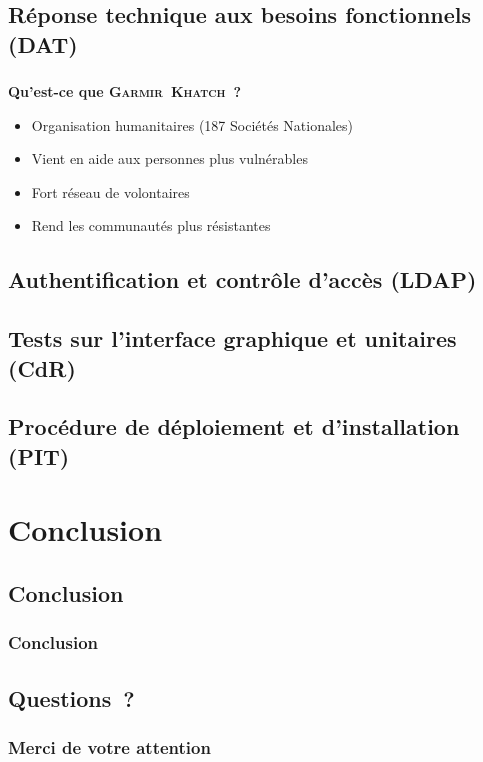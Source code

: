 \documentclass[10pt,fleqn]{beamer}
\newcommand{\mo}{\textsc{Garmir~Khatch}}
\begin{document}

\subsection[Réponse technique aux besoins fonctionnels (DAT)]{Réponse technique aux besoins fonctionnels (DAT)}
\begin{frame}
\frametitle{}
\begin{block}{\textbf{Qu'est-ce que \mo~?}}
\begin{itemize}
\item Organisation humanitaires (187 Sociétés Nationales)
\item Vient en aide aux personnes plus vulnérables
\item Fort réseau de volontaires
\item Rend les communautés plus résistantes
\end{itemize}
\end{block}
\end{frame}


\subsection[Authentification et contrôle d'accès (LDAP)]{Authentification et contrôle d'accès (LDAP)}



\subsection[Tests sur l'interface graphique et unitaires (CdR)]{Tests sur l'interface graphique et unitaires (CdR)}



\subsection[Procédure de déploiement et d'installation (PIT)]{Procédure de déploiement et d'installation (PIT)}
\begin{frame}
\end{frame}

\section[Conclusion]{Conclusion}

\subsection[Conclusion]{Conclusion}
\begin{frame}
	\frametitle{Conclusion}
\end{frame}

\subsection[Questions~?]{Questions~?}
\begin{frame}
	\frametitle{Merci de votre attention}
\end{frame}
\end{document}
